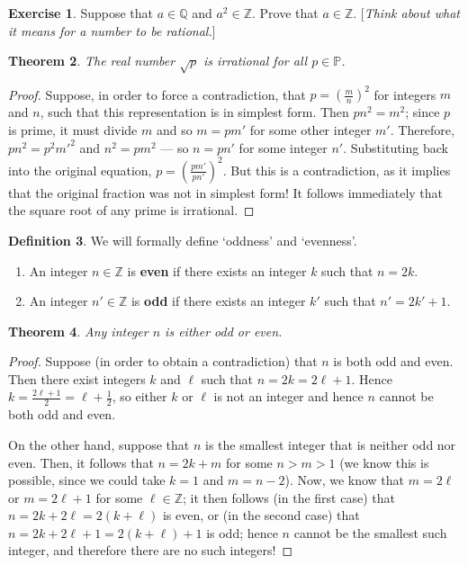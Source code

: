\documentclass[a4paper, 10pt]{amsart}
\newtheorem{thm}{Theorem}[section]
\theoremstyle{definition}
\newtheorem{defn}[thm]{Definition}
\newtheorem{exercise}[thm]{Exercise}
\theoremstyle{remark}
\begin{document}
\begin{exercise}
  Suppose that $ a \in \mathbb{Q} $ and $ a^2 \in \mathbb{Z} $. Prove that $ a \in \mathbb{Z} $. [\emph{Think about what it means for a number to be rational.}]
\end{exercise}

\begin{thm}\label{thm:irrational}
  The real number $ \sqrt{p} $ is irrational for all $ p \in \mathbb{P} $.
\end{thm}
\begin{proof}
  Suppose, in order to force a contradiction, that $ p = \left(\frac{m}{n}\right)^2 $ for integers $ m $ and $ n $, such
  that this representation is in simplest form. Then $ pn^2 = m^2 $; since $ p $ is prime, it must divide $ m $ and
  so $ m = pm' $ for some other integer $ m' $. Therefore, $ pn^2 = p^2 m'^2 $ and $ n^2 = pm^2 $ --- so $ n = pn' $ for
  some integer $ n' $. Substituting back into the original equation, $ p = \left(\frac{pm'}{pn'}\right)^2 $. But this
  is a contradiction, as it implies that the original fraction was not in simplest form! It follows immediately that the
  square root of any prime is irrational.
\end{proof}

\begin{defn}
  We will formally define `oddness' and `evenness'.
  \begin{enumerate}
    \item An integer $ n \in \mathbb{Z} $ is \textbf{even} if there exists an integer $ k $ such that $ n = 2k $.
    \item An integer $ n' \in \mathbb{Z} $ is \textbf{odd} if there exists an integer $ k' $ such that $ n' = 2k' + 1 $.
  \end{enumerate}
\end{defn}

\begin{thm}
  Any integer $ n $ is either odd or even.
\end{thm}
\begin{proof}
  Suppose (in order to obtain a contradiction) that $ n $ is both odd and even. Then there exist integers $ k $ and $ \ell $ such that $ n = 2k = 2\ell + 1 $.
  Hence $ k = \frac{2\ell + 1}{2} = \ell + \frac{1}{2} $, so either $ k $ or $ \ell $ is not an integer and hence $ n $ cannot be both odd and even.

  On the other hand, suppose that $ n $ is the smallest integer that is neither odd nor even. Then, it follows that $ n = 2k + m $ for some $ n > m > 1 $
  (we know this is possible, since we could take $ k = 1 $ and $ m = n - 2 $). Now, we know that $ m = 2\ell $ or $ m = 2\ell + 1 $ for some $ \ell \in \mathbb{Z} $;
  it then follows (in the first case) that $ n = 2k + 2\ell = 2(k + \ell) $ is even, or (in the second case) that $ n = 2k + 2\ell + 1 = 2(k + \ell) + 1 $ is
  odd; hence $ n $ cannot be the smallest such integer, and therefore there are no such integers!
\end{proof}
\end{document}
